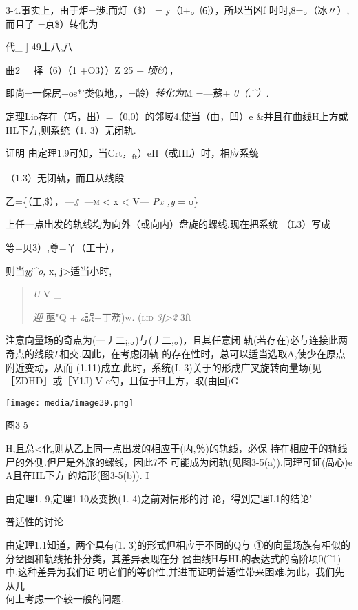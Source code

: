 \documentclass{article}
\begin{document}
3-4.事实上，由于炬=涉,而灯（\$） = y（l+。⑹），所以当凶f
时时,8=。（冰〃）,而且了 =京\$）转化为

代\_ {{]}} 49丄八,八

曲2 \_ 择（6）（1 +O3））Z 25 + \emph{顷\&}），

即尚=一保尻+os*'类似地，，=龄）\emph{转化为}M =---蘇+ \emph{0（.\^{}）.
\textbar{}}

定理Lio存在（巧，出）=（0,0）的邻域4,使当（由，凹）e
\&并且在曲线H上方或HL下方,则系统（1. 3）无闭轨.

证明 由定理1.9可知，当Crt，\textsubscript{ft}）eH（或HL）时，相应系统

（1.3）无闭轨，而且从线段

乙=\{（工,\$），\emph{---』---}\textsc{m} \textless{} x \textless{} V---
\emph{Px ,y} = o\}

上任一点岀发的轨线均为向外（或向内）盘旋的螺线.现在把系统 （L3）写成

等=贝3）,尊=丫（工十），

则当\emph{yj\^{}o,} \textbar{}x\textbar{},
\textbar{}j\textgreater{}\textbar{}适当小时,

\begin{quote}
\emph{U} V \_

\emph{迎} 亟"Q + z誤+丁務)w. \textsc{(lid} \emph{3f\textgreater{}2} 3ft
\end{quote}

注意向量场的奇点为(一丿二;,。)与(丿二,。)，且其任意闭
轨(若存在)必与连接此两奇点的线段\emph{L}相交.因此，在考虑闭轨
的存在性时，总可以适当选取A,使少在原点附近变动，从而
(1.11)成立.此时，系统(L 3)关于的形成广叉旋转向量场(见 ［ZDHD］或［Y1J).V
e勺，且位于H上方，取(由回)G

\texttt{[image: media/image39.png]}

图3-5

H,且总\textless{}化,则从乙上同一点出发的相应于(内,％)的轨线，必保
持在相应于的轨线尸的外侧.但尸是外旅的螺线，因此7不
可能成为闭轨(见图3-5(a)).同理可证(咼心)e A且在HL下方 的焙形(图3-5(b)). I

由定理1. 9,定理1.10及变换(1. 4)之前对情形的讨 论，得到定理L1的结论'

普适性的讨论

由定理1.1知道，两个具有(1. 3)的形式但相应于不同的Q与
①的向量场族有相似的分岔图和轨线拓扑分类，其差异表现在分
岔曲线H与HL的表达式的高阶项0(\^{}1)中.这种差异为我们证
明它们的等价性,并进而证明普适性带来困难.为此，我们先从几\\
何上考虑一个较一般的问题.
\end{document}
